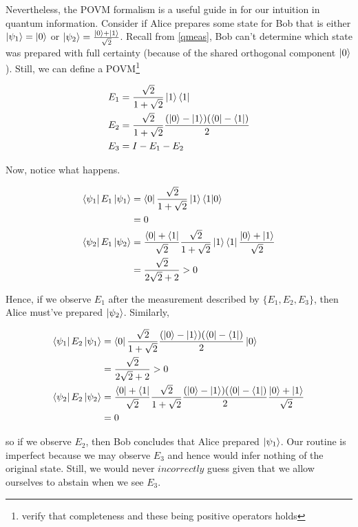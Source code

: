 \documentclass[main.tex]{subfiles}
\begin{document}
\begin{subappendices}
Nevertheless, the POVM formalism is a useful guide in for our intuition in quantum information. Consider if Alice prepares some state for Bob that is either $\ket{\psi_1} = \ket{0}$ or $\ket{\psi_2} = \frac{\ket{0} + \ket{1}}{\sqrt{2}}$. Recall from \ref{qmeas}, Bob can't determine which state was prepared with full certainty (because of the shared orthogonal component $\ket{0}$). Still, we can define a POVM\footnote{verify that completeness and these being positive operators holds}

\begin{align*}
E_1 &= \frac{\sqrt{2}}{1+\sqrt{2}}\ket{1}\bra{1}	\\
E_2 &= \frac{\sqrt{2}}{1+\sqrt{2}}\frac{(\ket{0} - \ket{1})(\bra{0} - \bra{1})}{2} \\
E_3 &= I - E_1 - E_2
\end{align*}

Now, notice what happens. 

\begin{align*}
\bra{\psi_1} E_1 \ket{\psi_1} &= \bra{0} \frac{\sqrt{2}}{1+\sqrt{2}}\ket{1}\bra{1}\ket{0} \\
	&= 0 \\
\bra{\psi_2} E_1 \ket{\psi_2} &= \frac{\bra{0} + \bra{1}}{\sqrt{2}}\frac{\sqrt{2}}{1+\sqrt{2}}\ket{1}\bra{1}\frac{\ket{0} + \ket{1}}{\sqrt{2}} \\
	&= \frac{\sqrt{2}}{2\sqrt{2} + 2} > 0 
\end{align*}

Hence, if we observe $E_1$ after the measurement described by $\{ E_1, E_2, E_3 \}$, then Alice must've prepared $\ket{\psi_2}$. Similarly,

\begin{align*}
\bra{\psi_1} E_2 \ket{\psi_1} &= \bra{0} \frac{\sqrt{2}}{1+\sqrt{2}}\frac{(\ket{0} - \ket{1})(\bra{0} - \bra{1})}{2}\ket{0} \\
	&= \frac{\sqrt{2}}{2\sqrt{2} + 2} > 0 \\
\bra{\psi_2} E_2 \ket{\psi_2} &= \frac{\bra{0} + \bra{1}}{\sqrt{2}}\frac{\sqrt{2}}{1+\sqrt{2}}\frac{(\ket{0} - \ket{1})(\bra{0} - \bra{1})}{2}\frac{\ket{0} + \ket{1}}{\sqrt{2}} \\
	&= 0
\end{align*}

so if we observe $E_2$, then Bob concludes that Alice prepared $\ket{\psi_1}$. Our routine is imperfect because we may observe $E_3$ and hence would infer nothing of the original state. Still, we would never $\textit{incorrectly}$ guess given that we allow ourselves to abstain when we see $E_3$. 


\end{subappendices}
\end{document}
